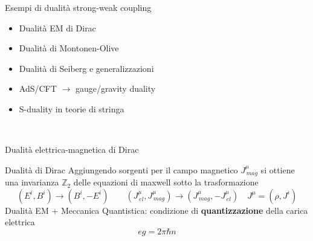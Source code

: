 \documentclass[10pt,compress,usenames,dvipsnames]{beamer}
\begin{document}
\begin{frame}{Esempi di dualità strong-weak coupling}
\vspace{-0,7cm}
\begin{itemize}
\item Dualità EM di Dirac
\item Dualità di Montonen-Olive
\item Dualità di Seiberg e generalizzazioni
\item AdS/CFT $\rightarrow$ gauge/gravity duality 
\item S-duality in teorie di stringa
\end{itemize}

\vspace{1cm}
\\[0,5cm]

\end{frame}

\begin{frame}{Dualità elettrica-magnetica di Dirac}

\begin{block}{Dualità di Dirac}
Aggiungendo sorgenti per il campo magnetico $J_{\, mag}^{\mu}$ si ottiene una invarianza $\mathbb{Z}_2$ delle equazioni di maxwell sotto la trasformazione
\begin{equation*}
 \left( {E}^i, {B}^i \right) \longrightarrow \left({B}^i, - {E}^i \right)
 \qquad \left( J_{\, el}^{\mu }, J_{\, mag}^{\mu} \right) \longrightarrow \left( 
 J_{\, mag}^{\mu},  - J_{\, el}^{\mu }
 \right)
 \quad  J^{\mu} = ( \rho , J^i)
\end{equation*}
Dualità EM + Meccanica Quantistica: condizione di \alert{\bfseries quantizzazione} della carica elettrica
$$
e g  = 2 \pi \hbar n
$$
\vspace{-0,3cm}
\end{block}

\vspace{0.5cm}
\end{frame}
\end{document}
